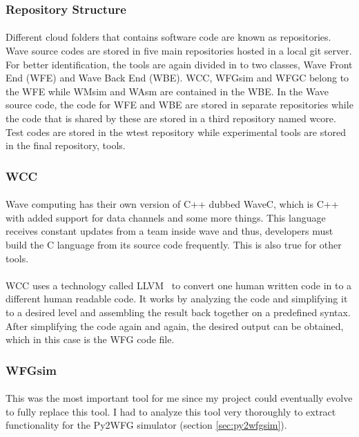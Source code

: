 \subsubsection{Repository Structure}
\paragraph{}
Different cloud folders that contains software code are known as repositories. Wave source codes are stored in five main repositories hosted in a local git server. For better identification, the tools are again divided in to two classes, Wave Front End (WFE) and Wave Back End (WBE). WCC, WFGsim and WFGC belong to the WFE while WMsim and WAsm are contained in the WBE. In the Wave source code, the code for WFE and WBE are stored in separate repositories while the code that is shared by these are stored in a third repository named wcore. Test codes are stored in the wtest repository while experimental tools are stored in the final repository, tools.

\subsubsection{WCC}
\paragraph{}
Wave computing has their own version of C++ dubbed WaveC, which is C++ with added support for data channels and some more things. This language receives constant updates from a team inside wave and thus, developers must build the C language from its source code frequently. This is also true for other tools.

\paragraph{}
WCC uses a technology called LLVM~\cite{LLVM} to convert one human written code in to a different human readable code. It works by analyzing the code and simplifying it to a desired level and assembling the result back together on a predefined syntax. After simplifying the code again and again, the desired output can be obtained, which in this case is the WFG code file.

\subsubsection{WFGsim}
\paragraph{}
This was the most important tool for me since my project could eventually evolve to fully replace this tool. I had to analyze this tool very thoroughly to extract functionality for the Py2WFG simulator (section \ref{sec:py2wfgsim}). 

